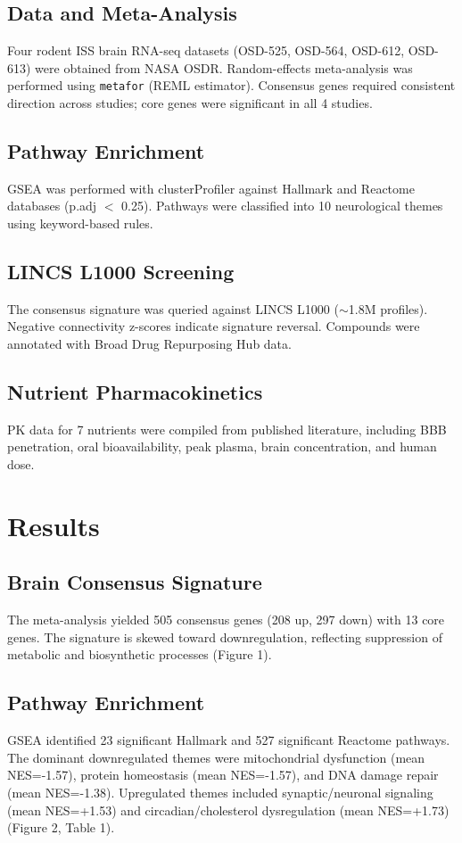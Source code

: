 \documentclass[11pt,a4paper]{article}
\begin{document}
\subsection{Data and Meta-Analysis}
Four rodent ISS brain RNA-seq datasets (OSD-525, OSD-564, OSD-612, OSD-613) were obtained from NASA OSDR. Random-effects meta-analysis was performed using \texttt{metafor} (REML estimator). Consensus genes required consistent direction across studies; core genes were significant in all 4 studies.

\subsection{Pathway Enrichment}
GSEA was performed with clusterProfiler against Hallmark and Reactome databases (p.adj $<$ 0.25). Pathways were classified into 10 neurological themes using keyword-based rules.

\subsection{LINCS L1000 Screening}
The consensus signature was queried against LINCS L1000 ($\sim$1.8M profiles). Negative connectivity z-scores indicate signature reversal. Compounds were annotated with Broad Drug Repurposing Hub data.

\subsection{Nutrient Pharmacokinetics}
PK data for 7 nutrients were compiled from published literature, including BBB penetration, oral bioavailability, peak plasma, brain concentration, and human dose.

\section{Results}
\subsection{Brain Consensus Signature}
The meta-analysis yielded 505 consensus genes (208 up, 297 down) with 13 core genes. The signature is skewed toward downregulation, reflecting suppression of metabolic and biosynthetic processes (Figure 1).

\subsection{Pathway Enrichment}
GSEA identified 23 significant Hallmark and 527 significant Reactome pathways. The dominant downregulated themes were mitochondrial dysfunction (mean NES=-1.57), protein homeostasis (mean NES=-1.57), and DNA damage repair (mean NES=-1.38). Upregulated themes included synaptic/neuronal signaling (mean NES=+1.53) and circadian/cholesterol dysregulation (mean NES=+1.73) (Figure 2, Table 1).
\end{document}
